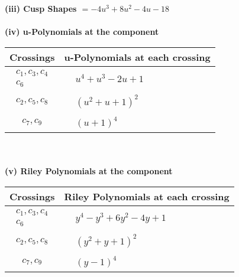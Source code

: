 \documentclass[1p]{elsarticle_modified}
\theoremstyle{definition}
\begin{document}
\flushleft \textbf{(iii) Cusp Shapes $= -4 u^3+8 u^2-4 u-18$}\\~\\
\newpage\renewcommand{\arraystretch}{1}
\flushleft \textbf{(iv) u-Polynomials at the component}\newline \\
\begin{tabular}{m{50pt}|m{274pt}}
Crossings & \hspace{64pt}u-Polynomials at each crossing \\
\hline $$\begin{aligned}c_{1},c_{3},c_{4}\\c_{6}\end{aligned}$$&$\begin{aligned}
&u^4+u^3-2 u+1
\end{aligned}$\\
\hline $$\begin{aligned}c_{2},c_{5},c_{8}\end{aligned}$$&$\begin{aligned}
&(u^2+u+1)^2
\end{aligned}$\\
\hline $$\begin{aligned}c_{7},c_{9}\end{aligned}$$&$\begin{aligned}
&(u+1)^4
\end{aligned}$\\
\hline
\end{tabular}\\~\\
\newpage\renewcommand{\arraystretch}{1}
\flushleft \textbf{(v) Riley Polynomials at the component}\newline \\
\begin{tabular}{m{50pt}|m{274pt}}
Crossings & \hspace{64pt}Riley Polynomials at each crossing \\
\hline $$\begin{aligned}c_{1},c_{3},c_{4}\\c_{6}\end{aligned}$$&$\begin{aligned}
&y^4- y^3+6 y^2-4 y+1
\end{aligned}$\\
\hline $$\begin{aligned}c_{2},c_{5},c_{8}\end{aligned}$$&$\begin{aligned}
&(y^2+y+1)^2
\end{aligned}$\\
\hline $$\begin{aligned}c_{7},c_{9}\end{aligned}$$&$\begin{aligned}
&(y-1)^4
\end{aligned}$\\
\hline
\end{tabular}\\~\\
\end{document}
